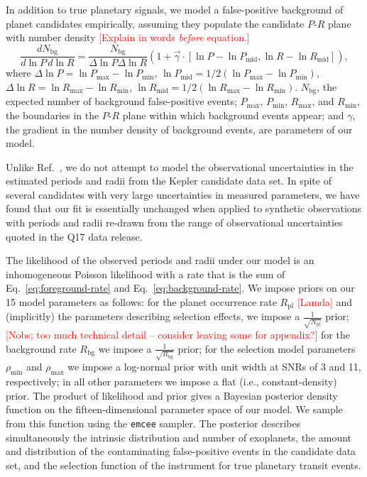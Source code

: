 \documentclass{nature}
\newcommand{\Rpl}{R_\mathrm{pl}}
\newcommand{\Npl}{N_\mathrm{pl}}
\newcommand{\Rbg}{R_\mathrm{bg}}
\newcommand{\Nbg}{N_\mathrm{bg}}
\newcommand{\rhomin}{\rho_\mathrm{min}}
\newcommand{\rhomax}{\rho_\mathrm{max}}
\newcommand{\ilya}[1]{\textcolor{red}{#1}}
\begin{document}
In addition to true planetary signals, we model a false-positive
background of planet candidates empirically, assuming they populate
the candidate $P$-$R$ plane with number density \ilya{[Explain in words {\it before} equation.]}
\begin{equation}
  \label{eq:background-rate}
  \frac{d\Nbg}{d \ln P \, d \ln R} = \frac{\Nbg}{\Delta \ln P \Delta
    \ln R} \left( 1 + \vec{\gamma} \cdot \left[ \ln P - \ln P_\mathrm{mid} , \ln
    R - \ln R_\mathrm{mid} \right] \right),
\end{equation}
where $\Delta \ln P = \ln P_\mathrm{max} - \ln P_\mathrm{min}$, $\ln
P_\mathrm{mid} = 1/2\left(\ln P_\mathrm{max} - \ln P_\mathrm{min}
\right)$, $\Delta \ln R = \ln R_\mathrm{max} - \ln R_\mathrm{min}$,
$\ln R_\mathrm{mid} = 1/2\left(\ln R_\mathrm{max} - \ln R_\mathrm{min}
\right)$.  $\Nbg$, the expected number of background false-positive
events; $P_\mathrm{max}$, $P_\mathrm{min}$, $R_\mathrm{max}$, and
$R_\mathrm{min}$, the boundaries in the $P$-$R$ plane within which
background events appear; and $\gamma$, the gradient in the number
density of background events, are parameters of our model.

Unlike Ref.\ \cite{Foreman-Mackey2014}, we do not attempt to model the
observational uncertainties in the estimated periods and radii from
the Kepler candidate data set.  In spite of several candidates with
very large uncertainties in measured parameters, we have found that our
fit is essentially unchanged when applied to synthetic observations
with periods and radii re-drawn from the range of observational
uncertainties quoted in the Q17 data release.  

The likelihood of the observed periods and radii under our model is an
inhomogeneous Poisson likelihood\cite{Farr2013,Youdin2011} with a rate
that is the sum of Eq.\ \eqref{eq:foreground-rate} and
Eq.\ \eqref{eq:background-rate}.  We impose priors on our 15 model
parameters as follows: for the planet occurrence rate $\Rpl$ \ilya{[Lamda]} and
(implicitly) the parameters describing selection effects, we impose a
$\frac{1}{\sqrt{\Npl}}$ prior; \ilya{[Nobs; too much technical detail -- consider leaving some for appendix?]} for the background rate $\Rbg$ we
impose a $\frac{1}{\sqrt{\Rbg}}$ prior; for the selection model
parameters $\rhomin$ and $\rhomax$ we impose a log-normal prior with
unit width at SNRs of 3 and 11, respectively; in all other parameters
we impose a flat (i.e., constant-density) prior.  The product of
likelihood and prior gives a Bayesian posterior density function on
the fifteen-dimensional parameter space of our model.  We sample from
this function using the \texttt{emcee} sampler\cite{Foreman-Mackey2013}.  The posterior describes
simultaneously the intrinsic distribution and number of exoplanets,
the amount and distribution of the contaminating false-positive events
in the candidate data set, and the selection function of the
instrument for true planetary transit events.
\end{document}
